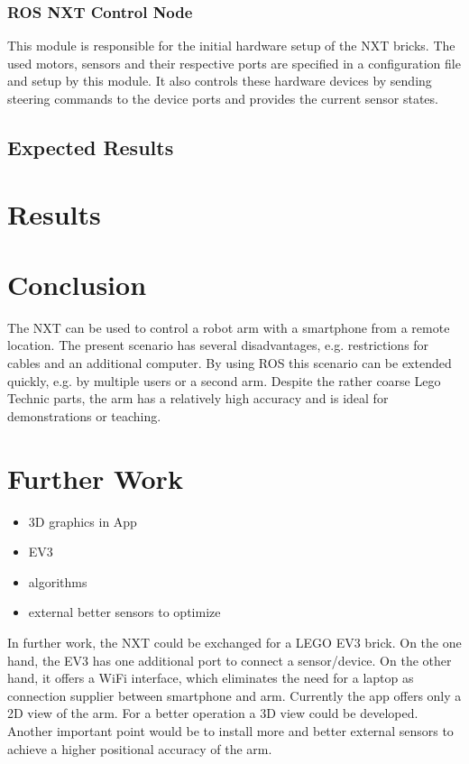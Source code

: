 \documentclass[conference]{IEEEtran}
\begin{document}
\subsubsection{ROS NXT Control Node}\label{sec:nxt_node}
This module is responsible for the initial hardware setup of the NXT bricks. The used motors, sensors and their respective ports are specified in a configuration file and setup by this module. It also controls these hardware devices by sending steering commands to the device ports and provides the current sensor states.

\subsection{Expected Results}\label{sec:expectedresults}

\section{Results}

\section{Conclusion}
The NXT can be used to control a robot arm with a smartphone from a remote location. The present scenario has several disadvantages, e.g. restrictions for cables and an additional computer.
By using ROS this scenario can be extended quickly, e.g. by multiple users or a second arm. Despite the rather coarse Lego Technic parts, the arm has a relatively high accuracy and is ideal for demonstrations or teaching.

\section{Further Work}
\begin{itemize}
	\item 3D graphics in App
	\item EV3
	\item algorithms
	\item external better sensors to optimize
\end{itemize}
In further work, the NXT could be exchanged for a LEGO EV3 brick. On the one hand, the EV3 has one additional port to connect a sensor/device. On the other hand, it offers a WiFi interface, which eliminates the need for a laptop as connection supplier between smartphone and arm.
Currently the app offers only a 2D view of the arm. For a better operation a 3D view could be developed.
Another important point would be to install more and better external sensors to achieve a higher positional accuracy of the arm.
\end{document}
